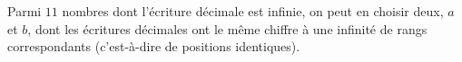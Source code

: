 Parmi $11$ nombres dont l'écriture décimale est infinie, on peut en choisir deux, $a$ et $b$, dont les écritures décimales ont le même chiffre à une infinité de rangs correspondants (c'est-à-dire de positions identiques).
